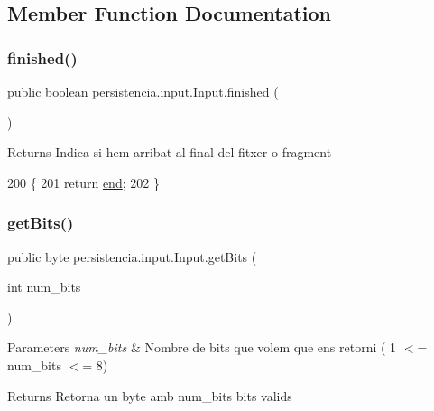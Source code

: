\subsection{Member Function Documentation}
\mbox{\label{classpersistencia_1_1input_1_1Input_af607cad1726ef15cf8e970dcbee74b68}} 
\subsubsection{\texorpdfstring{finished()}{finished()}}
{\footnotesize\ttfamily public boolean persistencia.\+input.\+Input.\+finished (\begin{DoxyParamCaption}{ }\end{DoxyParamCaption})\hspace{0.3cm}{\ttfamily [inline]}}

\begin{DoxyReturn}{Returns}
Indica si hem arribat al final del fitxer o fragment 
\end{DoxyReturn}

\begin{DoxyCode}
200                               \{
201         \textcolor{keywordflow}{return} \hyperlink{classpersistencia_1_1input_1_1Input_aa986cd4af0178e1a80f551dcd8936125}{end};
202     \}
\end{DoxyCode}
\mbox{\label{classpersistencia_1_1input_1_1Input_a3fa5a378b2155a3022a4a4ef38d63a8e}} 
\subsubsection{\texorpdfstring{get\+Bits()}{getBits()}}
{\footnotesize\ttfamily public byte persistencia.\+input.\+Input.\+get\+Bits (\begin{DoxyParamCaption}\item[{int}]{num\+\_\+bits }\end{DoxyParamCaption})\hspace{0.3cm}{\ttfamily [inline]}}


\begin{DoxyParams}{Parameters}
{\em num\+\_\+bits} & Nombre de bits que volem que ens retorni ( 1 $<$= num\+\_\+bits $<$= 8) \\
\hline
\end{DoxyParams}
\begin{DoxyReturn}{Returns}
Retorna un byte amb num\+\_\+bits bits valids 
\end{DoxyReturn}

